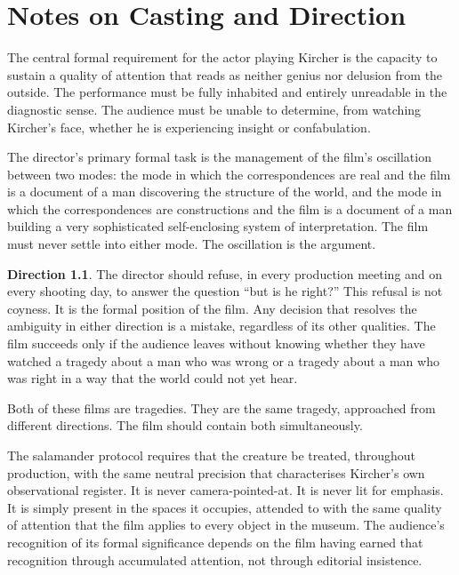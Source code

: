 \documentclass[12pt, a4paper, twoside]{memoir}
\theoremstyle{definition}
\newtheorem{direction}[sequence]{Direction}
\theoremstyle{remark}
\begin{document}
\chapter{Notes on Casting and Direction}

The central formal requirement for the actor playing Kircher is the capacity to sustain a quality of attention that reads as neither genius nor delusion from the outside. The performance must be fully inhabited and entirely unreadable in the diagnostic sense. The audience must be unable to determine, from watching Kircher's face, whether he is experiencing insight or confabulation.

The director's primary formal task is the management of the film's oscillation between two modes: the mode in which the correspondences are real and the film is a document of a man discovering the structure of the world, and the mode in which the correspondences are constructions and the film is a document of a man building a very sophisticated self-enclosing system of interpretation. The film must never settle into either mode. The oscillation is the argument.

\begin{direction}
\label{dir:direction}
The director should refuse, in every production meeting and on every shooting day, to answer the question ``but is he right?'' This refusal is not coyness. It is the formal position of the film. Any decision that resolves the ambiguity in either direction is a mistake, regardless of its other qualities. The film succeeds only if the audience leaves without knowing whether they have watched a tragedy about a man who was wrong or a tragedy about a man who was right in a way that the world could not yet hear.

Both of these films are tragedies. They are the same tragedy, approached from different directions. The film should contain both simultaneously.
\end{direction}

The salamander protocol requires that the creature be treated, throughout production, with the same neutral precision that characterises Kircher's own observational register. It is never camera-pointed-at. It is never lit for emphasis. It is simply present in the spaces it occupies, attended to with the same quality of attention that the film applies to every object in the museum. The audience's recognition of its formal significance depends on the film having earned that recognition through accumulated attention, not through editorial insistence.
\end{document}
